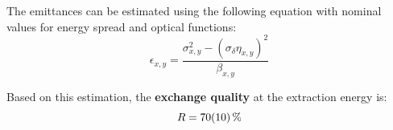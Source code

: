 \documentclass[a0paper,portrait]{baposter}
\begin{document}
\begin{poster}
{%
\begin{minipage}{0.55\textwidth}
The emittances can be estimated using the following equation with nominal values for energy spread and optical functions:
\[\epsilon_{x, y} = \frac{\sigma_{x, y}^2 - (\sigma_\delta \eta_{x,y})^2}{\beta_{x, y}} \]
\end{minipage}
\hfill
\begin{minipage}{0.4\textwidth}
\end{minipage}
\vspace{0.4cm}
\begin{minipage}{1\textwidth}
\centering
{}
\parbox[c]{0.3\textwidth}{}
\end{minipage}

Based on this estimation, the \textbf{exchange quality} at the extraction energy is:
\[ R = \SI{70 \pm 10}{\%}\]

}


\end{poster}
\end{document}
